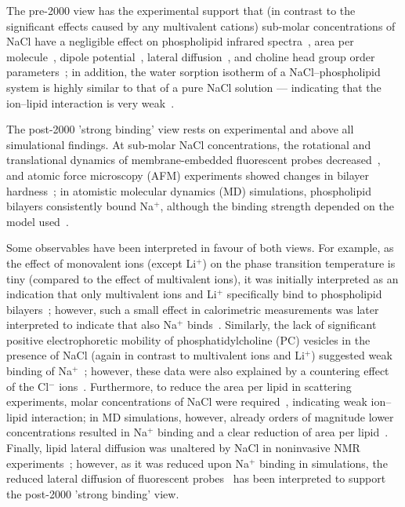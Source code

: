 The pre-2000 view has the experimental support that
(in contrast to the significant effects caused by any multivalent cations)
sub-molar concentrations of NaCl have a negligible effect on
phospholipid infrared spectra~\cite{binder02},
area per molecule~\cite{pabst07},
dipole potential~\cite{clarke99},
lateral diffusion~\cite{filippov09},
and choline head group order parameters~\cite{akutsu81};
in addition, the water sorption isotherm of a NaCl--phospholipid system
is highly similar to that of a  pure NaCl solution
--- indicating that the ion--lipid interaction is very weak~\cite{binder02}. 

The post-2000 'strong binding' view rests on experimental and above all simulational findings.
At sub-molar NaCl concentrations, the rotational and translational dynamics of membrane-embedded fluorescent probes decreased~\cite{bockmann03,vacha09a,harb13}, and atomic force microscopy (AFM) experiments showed changes in bilayer hardness~\cite{manyes05,manyes06,fukuma07,ferber11,morata12};
in atomistic molecular dynamics (MD) simulations, phospholipid bilayers consistently bound Na${^+}$,
although the binding strength depended on the model used~\cite{bockmann03,bockmann04,sachs04,berkowitz06,cordomi08,cordomi09,valley11,berkowitz12}.

Some observables have been interpreted in favour of both views. For example,
as the effect of monovalent ions (except Li$^+$)  on the phase transition temperature is tiny
(compared to the effect of multivalent ions), it was initially interpreted 
as an indication that only multivalent ions and Li$^+$ specifically bind to phospholipid bilayers~\cite{cevc90}; 
however, such a small effect in calorimetric measurements was later interpreted to indicate that also
Na$^+$ binds~\cite{bockmann03,klasczyk10}.
Similarly, the lack of significant positive electrophoretic mobility
of phosphatidylcholine (PC) vesicles in the presence of NaCl
(again in contrast to multivalent ions and Li$^+$)
suggested weak binding of Na$^+$~\cite{eisenberg79,tatulian87,manyes05,manyes06,klasczyk10};
however, these data were also explained by a countering effect of the Cl$^-$ ions~\cite{berkowitz06,knecht13}.
Furthermore, to reduce the area per lipid in scattering experiments, molar concentrations of NaCl were required~\cite{pabst07}, indicating weak ion--lipid interaction;
in MD simulations, however, already orders of magnitude lower concentrations resulted in Na$^+$ binding and a clear reduction of area per lipid~\cite{bockmann03,cordomi08}.
Finally, lipid lateral diffusion was unaltered by NaCl in noninvasive NMR experiments~\cite{filippov09};
however, as it was reduced upon Na$^+$ binding in simulations,
the reduced lateral diffusion of fluorescent probes~\cite{bockmann03,vacha09a,harb13}
has been interpreted to support the post-2000 'strong binding' view.

